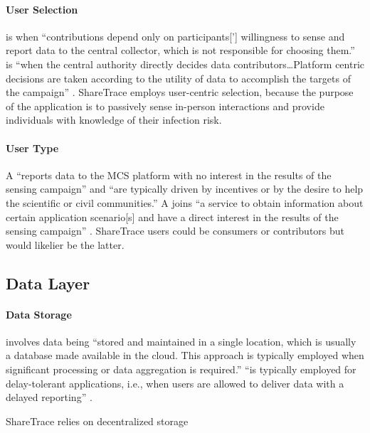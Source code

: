 \paragraph{User Selection}

 is when ``contributions depend only on participants['] willingness to sense and report data to the central collector, which is not responsible for choosing them.''  is ``when the central authority directly decides data contributors{\ldots}Platform centric decisions are taken according to the utility of data to accomplish the targets of the campaign'' \citep{Capponi2019}. ShareTrace employs user-centric selection, because the purpose of the application is to passively sense  in-person interactions and provide individuals with knowledge of their infection risk.

\paragraph{User Type}

A  ``reports data to the MCS platform with no interest in the results of the sensing campaign'' and ``are typically driven by incentives or by the desire to help the scientific or civil communities.'' A  joins ``a service to obtain information about certain application scenario[s] and have a direct interest in the results of the sensing campaign'' \citep{Capponi2019}. ShareTrace users could be consumers or contributors but would likelier be the latter.

\subsection{Data Layer}

\paragraph{Data Storage}

 involves data being ``stored and maintained in a single location, which is usually a database made available in the cloud. This approach is typically employed when significant processing or data aggregation is required.''  ``is typically employed for delay-tolerant applications, i.e., when users are allowed to deliver data with a delayed reporting'' \citep{Capponi2019}. 

ShareTrace relies on decentralized storage

